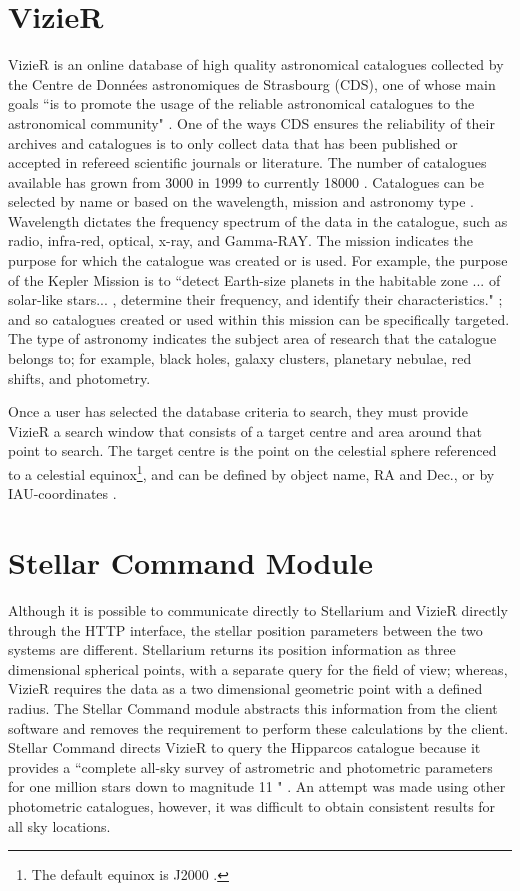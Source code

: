 \documentclass[10pt,a4paper,extrafontsizes]{memoir}
\begin{document}
\section{VizieR}
VizieR is an online database of high quality astronomical catalogues collected by the Centre de Donn\'ees astronomiques de Strasbourg (CDS), one of whose main goals  ``is to promote the usage of the reliable astronomical catalogues to the astronomical community" \cite[p.~25]{ochsenbein2000vizier}. One of the ways CDS ensures the reliability of their archives and catalogues is to only collect data that has been published or accepted in refereed scientific journals or literature. The number of catalogues available has grown from 3000 in 1999  \cite[p.~24]{ochsenbein2000vizier} to currently 18000 \cite{VizierPage}. Catalogues can be selected by name or based on the wavelength, mission and astronomy type \cite{vizquery}.  Wavelength dictates the frequency spectrum of the data in the catalogue, such as radio, infra-red, optical, x-ray, and Gamma-RAY. The mission indicates the purpose for which the catalogue was created or is used. For example, the purpose of the Kepler Mission is to ``detect Earth-size planets in the habitable zone ... of solar-like stars... , determine their frequency, and identify their characteristics." \cite[p.~2]{koch2010kepler}; and so catalogues created or used within this mission can be specifically targeted. The type of astronomy indicates the subject area of research that the catalogue belongs to; for example,  black holes, galaxy clusters, planetary nebulae, red shifts, and photometry. 

Once a user has selected the database criteria to search, they must provide VizieR  a search window that consists of a target centre and area around that point to search. The target centre is the point on the celestial sphere referenced to a celestial equinox\footnote{The default equinox is J2000 \cite{vizquery}.}, and can be defined by object name,  RA and Dec., or by IAU-coordinates \cite{vizquerytarget}.


\section{Stellar Command Module}
Although it is possible to communicate directly to Stellarium and VizieR directly through the HTTP interface, the stellar position parameters between the two systems are different. Stellarium returns its position information as three dimensional spherical points, with a separate query for the field of view; whereas, VizieR requires the data as a two dimensional geometric point with a defined radius. The Stellar Command module abstracts this information from the client software and removes the requirement to perform these calculations by the client. Stellar Command directs VizieR to query the Hipparcos catalogue because it provides a ``complete all-sky survey of astrometric and photometric parameters for one million stars down to magnitude 11 " \cite [p. ~201]{van1997hipparcos}. An attempt was made using other photometric catalogues, however, it was difficult to obtain consistent results for all sky locations.  
\end{document}
